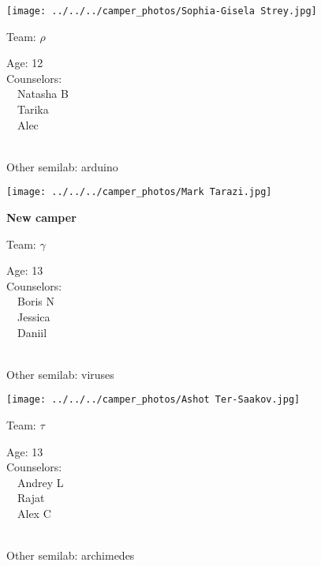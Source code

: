 \documentclass[10pt,letterpaper, landscape]{article}
\begin{document}
\horizontalshiftfornextsticker
\renewcommand{\baselinestretch}{1} \begin{sticker}
\noindent\begin{minipage}{0.5\textwidth}\texttt{[image: ../../../camper\_photos/Sophia-Gisela Strey.jpg]}\end{minipage}\begin{minipage}{0.45\textwidth}
Team: {\Large $\rho$}

Age:        12\\
Counselors: \\\ \ Natasha B\\\ \ Tarika\\\ \ Alec\\
\end{minipage} \\ \vspace{0.07in}
Other semilab: arduino
\end{sticker}
\horizontalshiftfornextsticker
\renewcommand{\baselinestretch}{1} \begin{sticker}
\noindent\begin{minipage}{0.5\textwidth}\texttt{[image: ../../../camper\_photos/Mark Tarazi.jpg]}\end{minipage}\begin{minipage}{0.45\textwidth}
\textbf{New camper} 

Team: {\Large $\gamma$}

Age:        13\\
Counselors: \\\ \ Boris N\\\ \ Jessica\\\ \ Daniil\\
\end{minipage} \\ \vspace{0.07in}
Other semilab: viruses
\end{sticker}
\verticalshiftfornextsticker
\renewcommand{\baselinestretch}{1} \begin{sticker}
\noindent\begin{minipage}{0.5\textwidth}\texttt{[image: ../../../camper\_photos/Ashot Ter-Saakov.jpg]}\end{minipage}\begin{minipage}{0.45\textwidth}
Team: {\Large $\tau$}

Age:        13\\
Counselors: \\\ \ Andrey L\\\ \ Rajat\\\ \ Alex C\\
\end{minipage} \\ \vspace{0.07in}
Other semilab: archimedes
\end{sticker}
\end{document}
